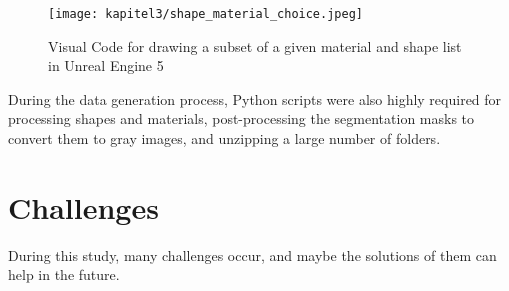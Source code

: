 		\begin{figure}[h]
			\centering
			\texttt{[image: kapitel3/shape\_material\_choice.jpeg]}
			\caption[Visual Code for drawing a subset of a given material and shape list in Unreal Engine 5 by Tobia Ippolito]{Visual Code for drawing a subset of a given material and shape list in Unreal Engine 5}
			\label{img:ue5_material_shape_choice}
		\end{figure}
		
		During the data generation process, Python scripts were also highly required for processing shapes and materials, post-processing the segmentation masks to convert them to gray images, and unzipping a large number of folders.
		
		
		
	\section{Challenges}
	\label{sec:challenges}
		During this study, many challenges occur, and maybe the solutions of them can help in the future.\\

